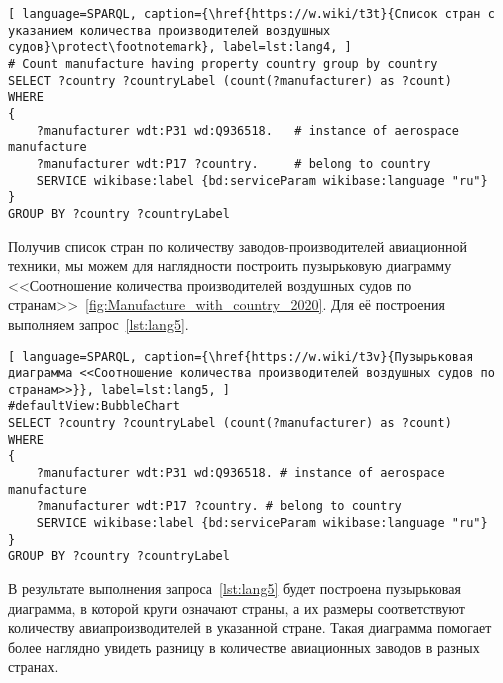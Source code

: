 \begin{lstlisting}[ language=SPARQL, caption={\href{https://w.wiki/t3t}{Список стран с указанием количества производителей воздушных судов}\protect\footnotemark}, label=lst:lang4, ]
# Count manufacture having property country group by country
SELECT ?country ?countryLabel (count(?manufacturer) as ?count)
WHERE
{
    ?manufacturer wdt:P31 wd:Q936518.   # instance of aerospace manufacture
    ?manufacturer wdt:P17 ?country.     # belong to country
    SERVICE wikibase:label {bd:serviceParam wikibase:language "ru"}
}
GROUP BY ?country ?countryLabel
\end{lstlisting}


Получив список стран по количеству заводов-производителей авиационной техники, мы можем для наглядности построить пузырьковую диаграмму <<Соотношение количества
производителей воздушных судов по странам>>~\ref{fig:Manufacture_with_country_2020}. Для её построения выполняем запрос~\ref{lst:lang5}.

\begin{lstlisting}[ language=SPARQL, caption={\href{https://w.wiki/t3v}{Пузырьковая диаграмма <<Соотношение количества производителей воздушных судов по странам>>}}, label=lst:lang5, ]
#defaultView:BubbleChart
SELECT ?country ?countryLabel (count(?manufacturer) as ?count)
WHERE
{
    ?manufacturer wdt:P31 wd:Q936518. # instance of aerospace manufacture
  	?manufacturer wdt:P17 ?country. # belong to country
    SERVICE wikibase:label {bd:serviceParam wikibase:language "ru"}
}
GROUP BY ?country ?countryLabel
\end{lstlisting}

В результате выполнения запроса~\ref{lst:lang5} будет построена пузырьковая диаграмма, в которой круги означают страны, а их размеры соответствуют количеству авиапроизводителей в указанной стране. Такая диаграмма помогает более наглядно увидеть разницу в количестве авиационных заводов в разных странах.
 
